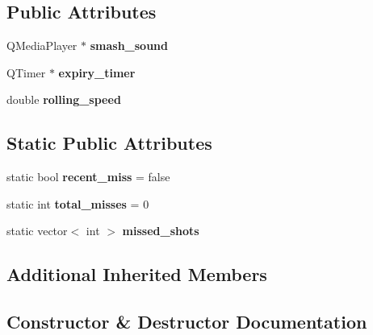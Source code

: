 \subsection*{Public Attributes}
\begin{DoxyCompactItemize}
\item 
\mbox{\label{classVirusObject_a90c989c71463003b8e69ccfbb5e8be62}} 
Q\+Media\+Player $\ast$ {\bfseries smash\+\_\+sound}
\item 
\mbox{\label{classVirusObject_a98f835b19e1ab22a79d1322ba5c6be07}} 
Q\+Timer $\ast$ {\bfseries expiry\+\_\+timer}
\item 
\mbox{\label{classVirusObject_a2d25a4fa8fc71cdc4b68936e8f578b21}} 
double {\bfseries rolling\+\_\+speed}
\end{DoxyCompactItemize}
\subsection*{Static Public Attributes}
\begin{DoxyCompactItemize}
\item 
\mbox{\label{classVirusObject_a02fb079085e3880476a7aec592f999cb}} 
static bool {\bfseries recent\+\_\+miss} = false
\item 
\mbox{\label{classVirusObject_a4995134404253ee91b388a30909265d6}} 
static int {\bfseries total\+\_\+misses} = 0
\item 
\mbox{\label{classVirusObject_a01a7bcc32a9798d84d54c38f23a23add}} 
static vector$<$ int $>$ {\bfseries missed\+\_\+shots}
\end{DoxyCompactItemize}
\subsection*{Additional Inherited Members}


\subsection{Constructor \& Destructor Documentation}
\mbox{\label{classVirusObject_ac37483ccb4d3814c67adf78e6497f667}} 
